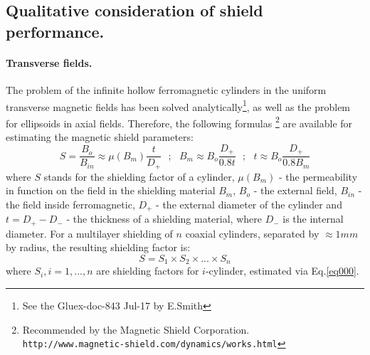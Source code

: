 \documentclass[12pt]{article}
\begin{document}
%
%
\subsection{Qualitative consideration of  shield performance.}
\paragraph{Transverse fields.}
The problem of the infinite hollow ferromagnetic cylinders in the uniform
transverse magnetic fields has been  solved analytically\footnote{See the  Gluex-doc-843 Jul-17 by E.Smith}, as well as the
 problem  for ellipsoids in axial fields.  Therefore,  the following formulas
\footnote{Recommended by  the Magnetic Shield
 Corporation.\\
{\verb |http://www.magnetic-shield.com/dynamics/works.html|}}
 are available for estimating  the magnetic shield parameters:
\begin{equation}
S=\frac{B_o}{B_{in}}\approx \mu({B_m})\frac{t}{D_+}~~~;~~~B_m\approx B_o\frac{D_+}{0.8t}~~~;~~~t\approx B_o\frac{D_+}{0.8B_m}
\label{eq000}
\end{equation}
where $S$ stands for the shielding factor of a cylinder,
$\mu(B_m)$ - the permeability in function  on the field in the shielding material $B_m$,
$B_o$ - the external  field, 
$B_{in}$ - the field inside ferromagnetic,
$D_+$ - the external diameter of the cylinder and
$t=D_+-D_-$ - the thickness of a shielding material, where $D_-$ 
is the internal diameter. 
For a multilayer shielding of $n$ coaxial cylinders, separated by $\approx 1mm$ by radius,
the resulting shielding factor is:
%
\begin{equation}
S=S_1 \times S_2 \times...\times S_n
\label{eq777}
\end{equation}
%
where $S_i,i=1,...,n$ are shielding factors for
$i$-cylinder,  estimated via Eq.\ref{eq000}.
\end{document}
